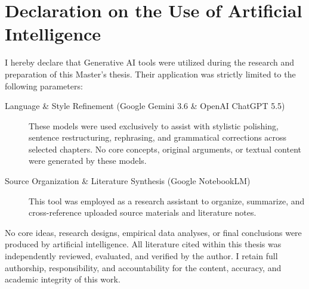 \section{Declaration on the Use of Artificial Intelligence}

I hereby declare that Generative AI tools were utilized during the research and preparation of this Master's thesis. Their application was strictly limited to the following parameters:

\begin{description}
	\item[Language \& Style Refinement (Google Gemini 3.6 \& OpenAI ChatGPT 5.5)]
	These models were used exclusively to assist with stylistic polishing, sentence restructuring, rephrasing, and grammatical corrections across selected chapters. No core concepts, original arguments, or textual content were generated by these models.
	
	\item[Source Organization \& Literature Synthesis (Google NotebookLM)]
	This tool was employed as a research assistant to organize, summarize, and cross-reference uploaded source materials and literature notes. 
\end{description}

\vspace{1em}

No core ideas, research designs, empirical data analyses, or final conclusions were produced by artificial intelligence. All literature cited within this thesis was independently reviewed, evaluated, and verified by the author. I retain full authorship, responsibility, and accountability for the content, accuracy, and academic integrity of this work.

